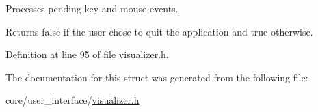 Processes pending key and mouse events. 

\begin{DoxyReturn}{Returns}
{\ttfamily false} if the user chose to quit the application and {\ttfamily true} otherwise. 
\end{DoxyReturn}


Definition at line 95 of file visualizer.\+h.



The documentation for this struct was generated from the following file\+:\begin{DoxyCompactItemize}
\item 
core/user\+\_\+interface/\hyperlink{visualizer_8h}{visualizer.\+h}\end{DoxyCompactItemize}
